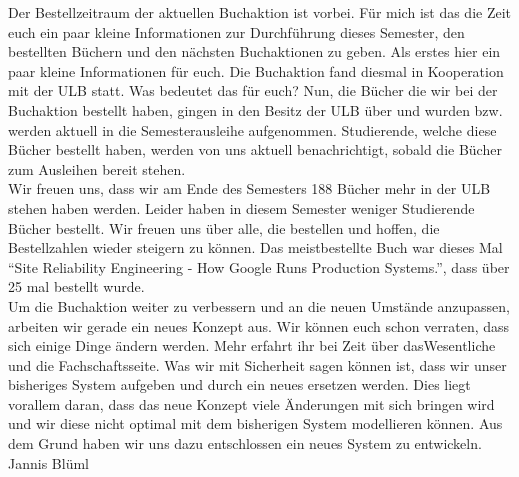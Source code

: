{Der Bestellzeitraum der aktuellen Buchaktion ist vorbei. Für mich ist das die Zeit euch ein paar kleine Informationen zur Durchführung dieses Semester, den bestellten Büchern und den nächsten Buchaktionen zu geben.}
{
Als erstes hier ein paar kleine Informationen für euch. Die Buchaktion fand
diesmal in Kooperation mit der ULB statt. Was bedeutet das für euch? Nun, die
Bücher die wir bei der Buchaktion bestellt haben, gingen in den Besitz der ULB
über und wurden bzw. werden aktuell in die Semesterausleihe aufgenommen.
Studierende, welche diese Bücher bestellt haben, werden von uns  aktuell benachrichtigt, sobald die Bücher zum Ausleihen bereit stehen. \\

Wir freuen uns, dass wir am Ende des Semesters 188 Bücher mehr in der ULB
stehen haben werden. Leider haben in diesem Semester weniger Studierende Bücher
bestellt. Wir freuen uns über alle, die bestellen und hoffen, die
Bestellzahlen wieder steigern zu können. Das meistbestellte Buch war dieses Mal
\enquote{Site Reliability Engineering -  How Google Runs Production Systems.}, dass über 25 mal bestellt wurde. \\

Um die Buchaktion weiter zu verbessern und an die neuen Umstände anzupassen, arbeiten wir gerade ein neues Konzept aus.
Wir können euch schon verraten, dass sich einige Dinge ändern werden. Mehr erfahrt ihr bei Zeit über dasWesentliche und die Fachschaftsseite. Was wir mit Sicherheit sagen können ist, dass wir unser bisheriges System aufgeben und durch ein neues ersetzen werden. Dies liegt vorallem daran, dass das neue Konzept viele Änderungen mit sich bringen wird und wir diese nicht optimal mit dem bisherigen System modellieren können. Aus dem Grund haben wir uns dazu entschlossen ein neues System zu entwickeln.
}
{Jannis Blüml} 
